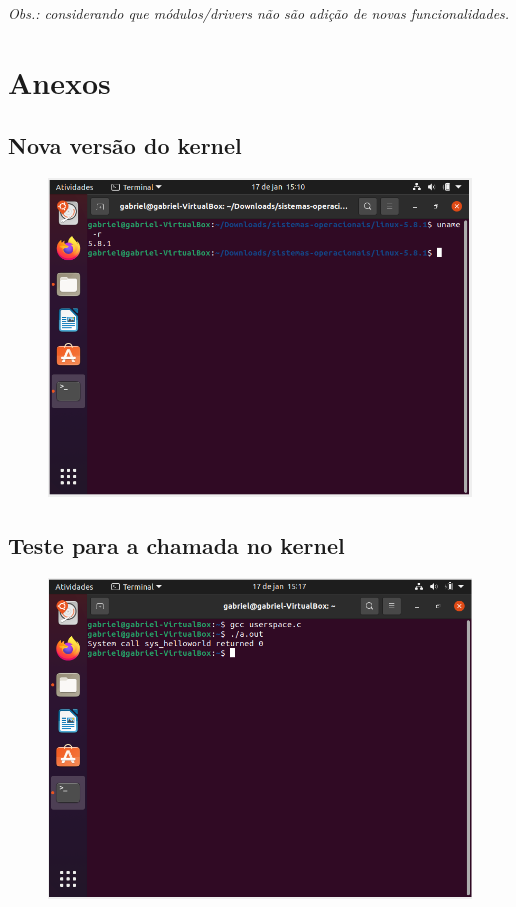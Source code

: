 \documentclass[12pt, a4paper]{article}
\begin{document}
	\vspace{\baselineskip}
	
	\par \textit{Obs.: considerando que módulos/drivers não são adição de novas funcionalidades.}
	
	\newpage
	
	\section{Anexos}
	
	\subsection{Nova versão do kernel}
    
    \begin{figure}[hbp!]
        \centering
        \includegraphics[width=12cm]{img/novo_kernel.png}
    \end{figure}
    
    \subsection{Teste para a chamada no kernel}
    
    \begin{figure}[hbp!]
        \centering
        \includegraphics[width=12cm]{img/teste_chamada.png}
    \end{figure}
    
\end{document}
